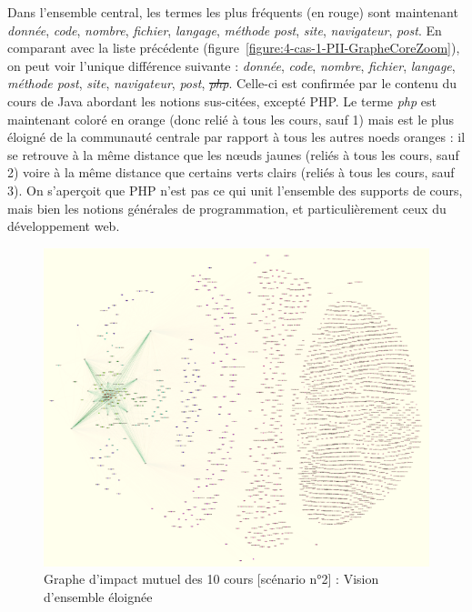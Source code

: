 \bigskip

Dans l'ensemble central, les termes les plus fréquents (en rouge) sont maintenant \textit{donnée}, \textit{code}, \textit{nombre}, \textit{fichier}, \textit{langage}, \textit{méthode post}, \textit{site}, \textit{navigateur}, \textit{post}.
En comparant avec la liste précédente (figure~\ref{figure:4-cas-1-PII-GrapheCoreZoom}), on peut voir l'unique différence suivante : \textit{donnée}, \textit{code}, \textit{nombre}, \textit{fichier}, \textit{langage}, \textit{méthode post}, \textit{site}, \textit{navigateur}, \textit{post}, \sout{\textit{php}}.
Celle-ci est confirmée par le contenu du cours de Java abordant les notions sus-citées, excepté PHP.
Le terme \textit{php} est maintenant coloré en orange (donc relié à tous les cours, sauf 1) mais est le plus éloigné de la communauté centrale par rapport à tous les autres noe{}ds oranges : il se retrouve à la même distance que les n\oe{}uds jaunes (reliés à tous les cours, sauf 2) voire à la même distance que certains verts clairs (reliés à tous les cours, sauf 3).
On s'aperçoit que PHP n'est pas ce qui unit l'ensemble des supports de cours, mais bien les notions générales de programmation, et particulièrement ceux du développement web.



\vfill
\hspace{0pt}

\begin{figure}[htb!]
\centering
\centerline{  %
\includegraphics[scale=0.8]{4-Experiences/images/cas-2/graphe-Directe-dezoom.png}
}
\caption{Graphe d'impact mutuel des 10 cours [scénario n°2] : Vision d'ensemble éloignée}
\label{figure:4-cas-2-PII-GrapheDezoom}
\end{figure}

